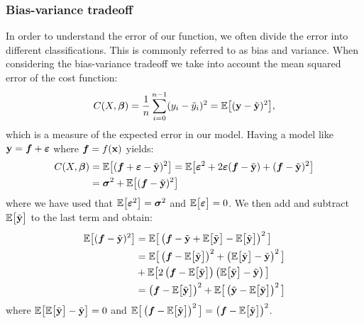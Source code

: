 \subsubsection{Bias-variance tradeoff}\label{sec:bias_variance_tradeoff}
In order to understand the error of our function, we often divide the error into different classifications. This is commonly referred to as bias and variance. When considering the bias-variance tradeoff we take into account the mean squared error of the cost function:
\begin{align*}
    C(X, \boldsymbol{\beta}) = \frac{1}{n}\sum_{i=0}^{n-1}(y_i-\tilde{y}_i)^2 = \mathbb{E}\big[(\mathbf{y}-\tilde{\mathbf{y}})^2\big],
\end{align*}
which is a measure of the expected error in our model. Having a model like $\mathbf{y} = \boldsymbol{f} + \boldsymbol{\varepsilon}$ where $\boldsymbol{f} = f(\mathbf{x})$ yields:
\begin{align*}
    C(X, \boldsymbol{\beta})  &= \mathbb{E}\big[(\boldsymbol{f} + \boldsymbol{\varepsilon} - \tilde{\mathbf{y}})^2\big] = \mathbb{E}\big[\boldsymbol{\varepsilon}^2 + 2\boldsymbol{\varepsilon}(\boldsymbol{f}-\tilde{\mathbf{y}}) + (\boldsymbol{f}-\tilde{\mathbf{y}})^2\big] \\
    &= \boldsymbol{\sigma}^2 + \mathbb{E}\big[(\boldsymbol{f}-\tilde{\mathbf{y}})^2\big]
\end{align*}
where we have used that $\mathbb{E}\big[\boldsymbol{\varepsilon}^2\big] = \boldsymbol{\sigma}^2$ and $\mathbb{E}\big[\boldsymbol{\varepsilon}\big] = 0$. We then add and subtract $\mathbb{E}\big[\tilde{\mathbf{y}}\big]$ to the last term and obtain:
\begin{align*}
    \mathbb{E}\big[(\boldsymbol{f}-\tilde{\mathbf{y}})^2\big] &= \mathbb{E}\big[\left(\boldsymbol{f}-\tilde{\mathbf{y}}+\mathbb{E}\big[\tilde{\mathbf{y}}\big]-\mathbb{E}\big[\tilde{\mathbf{y}}\big]\right)^2\big] \\
    &= \mathbb{E}\big[\left(\boldsymbol{f}-\mathbb{E}\big[\tilde{\mathbf{y}}\big]\right)^2+ \left(\mathbb{E}\big[\tilde{\mathbf{y}}\big]-\tilde{\mathbf{y}}\right)^2\big] \\
    &+ \mathbb{E}\big[2\left(\boldsymbol{f}-\mathbb{E}\big[\tilde{\mathbf{y}}\big]\right)\left(\mathbb{E}\big[\tilde{\mathbf{y}}\big]-\tilde{\mathbf{y}}\right)\big] \\
    &=\left(\boldsymbol{f}-\mathbb{E}\big[\tilde{\mathbf{y}}\big]\right)^2+ \mathbb{E}\big[\left(\tilde{\mathbf{y}}-\mathbb{E}\big[\tilde{\mathbf{y}}\big]\right)^2\big]
\end{align*}
where $\mathbb{E}\big[\mathbb{E}\big[\tilde{\mathbf{y}}\big] - \tilde{\mathbf{y}}\big] = 0$ and $\mathbb{E}\big[\left(\boldsymbol{f}-\mathbb{E}\big[\tilde{\mathbf{y}}\big]\right)^2\big]=\left(\boldsymbol{f}-\mathbb{E}\big[\tilde{\mathbf{y}}\big]\right)^2$.

